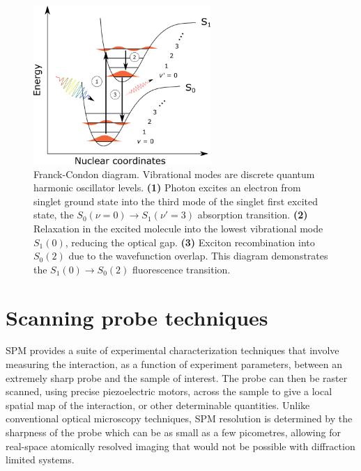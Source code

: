 \begin{figure}[H]
    \centering
    \includegraphics[width=0.6\textwidth]{pictures/franck_condon_transitions.png}
    \caption{Franck-Condon diagram. Vibrational modes are discrete quantum harmonic oscillator levels. \textbf{(1)} Photon excites an electron from singlet ground state into the third mode of the singlet first excited state, the $S_0(\nu=0) \rightarrow S_1(\nu'=3)$ absorption transition. \textbf{(2)} Relaxation in the excited molecule into the lowest vibrational mode $S_1(0)$, reducing the optical gap. \textbf{(3)} Exciton recombination into $S_0(2)$ due to the wavefunction overlap. This diagram demonstrates the $S_1(0) \rightarrow S_0(2)$ fluorescence transition.}
    \label{fig:intro:vib}
\end{figure}



\section{Scanning probe techniques}


\Acf{SPM} provides a suite of experimental characterization techniques that involve measuring the interaction, as a function of experiment parameters, between an extremely sharp probe and the sample of interest. The probe can then be raster scanned, using precise piezoelectric motors, across the sample to give a local spatial map of the interaction, or other determinable quantities. Unlike conventional optical microscopy techniques, \ac{SPM} resolution is determined by the sharpness of the probe which can be as small as a few picometres, allowing for real-space atomically resolved imaging that would not be possible with diffraction limited systems.

